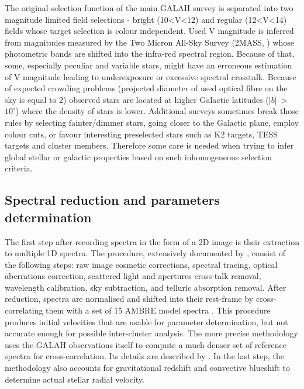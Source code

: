 The original selection function of the main GALAH survey is separated into two magnitude limited field selections - bright (10<V<12) and regular (12<V<14) fields whose target selection is colour independent. Used V magnitude is inferred from magnitudes measured by the Two Micron All-Sky Survey (2MASS, \cite{2006AJ....131.1163S}) whose photometric bands are shifted into the infra-red spectral region. Because of that, some, especially peculiar and variable stars, might have an erroneous estimation of V magnitude leading to underexposure or excessive spectral crosstalk. Because of expected crowding problems (projected diameter of used optical fibre on the sky is equal to $2$\arcsec) observed stars are located at higher Galactic latitudes ($|b|$~>~$10^\circ$) where the density of stars is lower. Additional surveys sometimes break those rules by selecting fainter/dimmer stars, going closer to the Galactic plane, employ colour cuts, or favour interesting preselected stars such as K2 \cite{2014PASP..126..398H} targets, TESS \cite{2015JATIS...1a4003R} targets and cluster members. Therefore some care is needed when trying to infer global stellar or galactic properties based on such inhomogeneous selection criteria.

\subsection{Spectral reduction and parameters determination}
The first step after recording spectra in the form of a 2D image is their extraction to multiple 1D spectra. The procedure, extensively documented by \citet{2017MNRAS.464.1259K}, consist of the following steps: raw image cosmetic corrections, spectral tracing, optical aberrations correction, scattered light and apertures cross-talk removal, wavelength calibration, sky subtraction, and telluric absorption removal. After reduction, spectra are normalised and shifted into their rest-frame by cross-correlating them with a set of 15 AMBRE model spectra \cite{2012A&A...544A.126D}. This procedure produces initial velocities that are usable for parameter determination, but not accurate enough for possible inter-cluster analysis. The more precise methodology uses the GALAH observations itself to compute a much denser set of reference spectra for cross-correlation. Its details are described by \citet{2018arXiv180406344Z}. In the last step, the methodology also accounts for gravitational redshift and convective blueshift to determine actual stellar radial velocity. 

